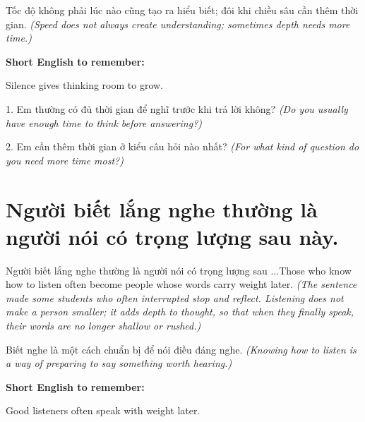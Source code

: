 \begin{baihoc}
Tốc độ không phải lúc nào cũng tạo ra hiểu biết; đôi khi chiều sâu cần thêm thời gian.
\textit{(Speed does not always create understanding; sometimes depth needs more time.)}
\end{baihoc}

\begin{ghinhoanh}
\textbf{Short English to remember:}

Silence gives thinking room to grow.

\end{ghinhoanh}

\begin{tuhocnhanh}
1. Em thường có đủ thời gian để nghĩ trước khi trả lời không? \textit{(Do you usually have enough time to think before answering?)}

2. Em cần thêm thời gian ở kiểu câu hỏi nào nhất? \textit{(For what kind of question do you need more time most?)}
\end{tuhocnhanh}
\ngancach


\section{Người biết lắng nghe thường là người nói có trọng lượng sau này.}
\begin{truyen}{Người biết lắng nghe thường là người nói có trọng lượng sau ...}{Those who know how to listen often become people whose words carry weight later.}
\textit{(The sentence made some students who often interrupted stop and reflect. Listening does not make a person smaller; it adds depth to thought, so that when they finally speak, their words are no longer shallow or rushed.)}
\end{truyen}

\begin{baihoc}
Biết nghe là một cách chuẩn bị để nói điều đáng nghe.
\textit{(Knowing how to listen is a way of preparing to say something worth hearing.)}
\end{baihoc}

\begin{ghinhoanh}
\textbf{Short English to remember:}

Good listeners often speak with weight later.

\end{ghinhoanh}

